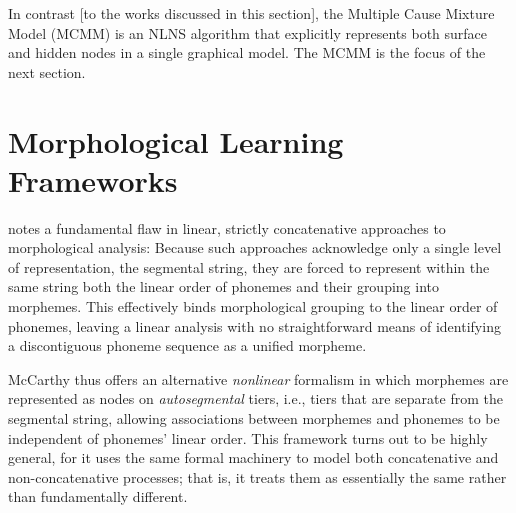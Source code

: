  In contrast [to the works discussed in this section], the Multiple Cause Mixture Model (MCMM) \citep{saund:94} is an NLNS algorithm that explicitly represents both surface and hidden nodes in a single graphical model. The MCMM is the focus of the next section.
 
 
\section{Morphological Learning Frameworks}
\label{sec:rel-work}
\cite{mccarthy:1981} notes a fundamental flaw in linear, strictly concatenative approaches to morphological analysis: 
Because such approaches acknowledge only a single level of representation, the segmental string, they are forced to represent within the same string both the linear order of phonemes and their grouping into morphemes. This effectively binds morphological grouping to the linear order of phonemes, leaving a linear analysis  
with no straightforward means of identifying a discontiguous phoneme sequence as a unified morpheme.


McCarthy thus offers an alternative \emph{nonlinear} formalism in which morphemes are represented as nodes on \emph{autosegmental} tiers, 
i.e., tiers that are separate from the segmental string, allowing
associations between morphemes and phonemes to be independent of phonemes' linear order.
This framework turns out to be highly general, for it uses the same formal machinery to model both 
concatenative and non-concatenative processes; that is, it treats them as essentially the same rather than fundamentally different.

